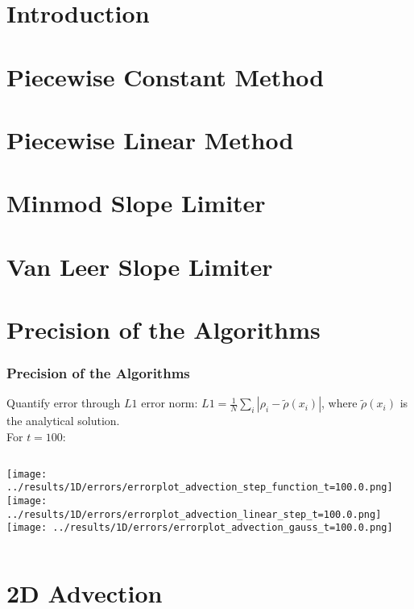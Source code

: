 \begin{frame}{}
	\titlepage
\end{frame}


\section{Introduction}



\section{Piecewise Constant Method}


\section{Piecewise Linear Method}


\section{Minmod Slope Limiter}



\section{Van Leer Slope Limiter}



\section{Precision of the Algorithms}

\begin{frame}
	\frametitle{Precision of the Algorithms}
	Quantify error through $L1$ error norm: $L1 = \frac{1}{N} \sum\limits_i |\rho_i - \tilde{\rho}(x_i)|$, where $\tilde{\rho}(x_i)$ is the analytical solution.\\[2em]
	
	For $t = 100$:\\\vfill
	
	\begin{columns}
			\texttt{[image: ../results/1D/errors/errorplot\_advection\_step\_function\_t=100.0.png]}
			\texttt{[image: ../results/1D/errors/errorplot\_advection\_linear\_step\_t=100.0.png]}
			\texttt{[image: ../results/1D/errors/errorplot\_advection\_gauss\_t=100.0.png]}	
	\end{columns}
	
\end{frame}





\section{2D Advection}

























